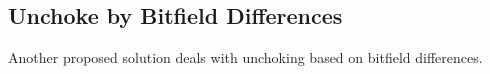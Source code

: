 \subsection{Unchoke by Bitfield Differences}

Another proposed solution deals with unchoking based on bitfield differences.
